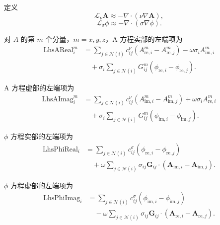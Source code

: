 \documentclass[UTF8,11pt]{ctexart}
\begin{document}
定义
\begin{equation}
    \mathcal{L}_{\nu}\bm A
    \approx
    -\nabla\cdot(\nu\nabla \bm A),
\end{equation}
\begin{equation}
    \mathcal{L}_{\sigma}\phi
    \approx
    -\nabla\cdot(\sigma\nabla \phi).
\end{equation}

对 $A$ 的第 $m$ 个分量，$m=x,y,z$，A 方程实部的左端项为
\begin{align}
    \mathrm{LhsAReal}_i^m
    &=
    \sum_{j\in\mathcal{N}(i)}
    c_{ij}^{\nu}
    \left(
        A_{\mathrm{re},i}^m
        -
        A_{\mathrm{re},j}^m
    \right)
    -
    \omega\sigma_i A_{\mathrm{im},i}^m
    \nonumber\\
    &\quad
    +
    \sigma_i
    \sum_{j\in\mathcal{N}(i)}
    G_{ij}^m
    \left(
        \phi_{\mathrm{re},i}
        -
        \phi_{\mathrm{re},j}
    \right).
    \label{eq:lhs-a-real-particle}
\end{align}

A 方程虚部的左端项为
\begin{align}
    \mathrm{LhsAImag}_i^m
    &=
    \sum_{j\in\mathcal{N}(i)}
    c_{ij}^{\nu}
    \left(
        A_{\mathrm{im},i}^m
        -
        A_{\mathrm{im},j}^m
    \right)
    +
    \omega\sigma_i A_{\mathrm{re},i}^m
    \nonumber\\
    &\quad
    +
    \sigma_i
    \sum_{j\in\mathcal{N}(i)}
    G_{ij}^m
    \left(
        \phi_{\mathrm{im},i}
        -
        \phi_{\mathrm{im},j}
    \right).
    \label{eq:lhs-a-imag-particle}
\end{align}

$\phi$ 方程实部的左端项为
\begin{align}
    \mathrm{LhsPhiReal}_i
    &=
    \sum_{j\in\mathcal{N}(i)}
    c_{ij}^{\sigma}
    \left(
        \phi_{\mathrm{re},i}
        -
        \phi_{\mathrm{re},j}
    \right)
    \nonumber\\
    &\quad
    +
    \omega
    \sum_{j\in\mathcal{N}(i)}
    \sigma_{ij}\bm G_{ij}\cdot
    \left(
        \bm A_{\mathrm{im},i}
        -
        \bm A_{\mathrm{im},j}
    \right).
    \label{eq:lhs-phi-real-particle}
\end{align}

$\phi$ 方程虚部的左端项为
\begin{align}
    \mathrm{LhsPhiImag}_i
    &=
    \sum_{j\in\mathcal{N}(i)}
    c_{ij}^{\sigma}
    \left(
        \phi_{\mathrm{im},i}
        -
        \phi_{\mathrm{im},j}
    \right)
    \nonumber\\
    &\quad
    -
    \omega
    \sum_{j\in\mathcal{N}(i)}
    \sigma_{ij}\bm G_{ij}\cdot
    \left(
        \bm A_{\mathrm{re},i}
        -
        \bm A_{\mathrm{re},j}
    \right).
    \label{eq:lhs-phi-imag-particle}
\end{align}
\end{document}
